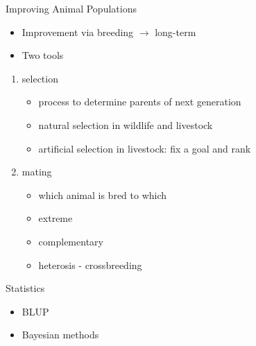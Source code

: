 \documentclass[ignorenonframetext,]{beamer}
\providecommand{\tightlist}{%
  \setlength{\itemsep}{0pt}\setlength{\parskip}{0pt}}
\begin{document}
\begin{frame}{Improving Animal Populations}
\protect\hypertarget{improving-animal-populations}{}

\begin{itemize}
\tightlist
\item
  Improvement via breeding \(\rightarrow\) long-term
\item
  Two tools
\end{itemize}

\begin{enumerate}
\tightlist
\item
  selection

  \begin{itemize}
  \tightlist
  \item
    process to determine parents of next generation
  \item
    natural selection in wildlife and livestock
  \item
    artificial selection in livestock: fix a goal and rank
  \end{itemize}
\item
  mating

  \begin{itemize}
  \tightlist
  \item
    which animal is bred to which
  \item
    extreme
  \item
    complementary
  \item
    heterosis - crossbreeding
  \end{itemize}
\end{enumerate}


\end{frame}

\begin{frame}{Statistics}
\protect\hypertarget{statistics}{}

\begin{itemize}
\tightlist
\item
  BLUP
\item
  Bayesian methods
\end{itemize}


\end{frame}
\end{document}
